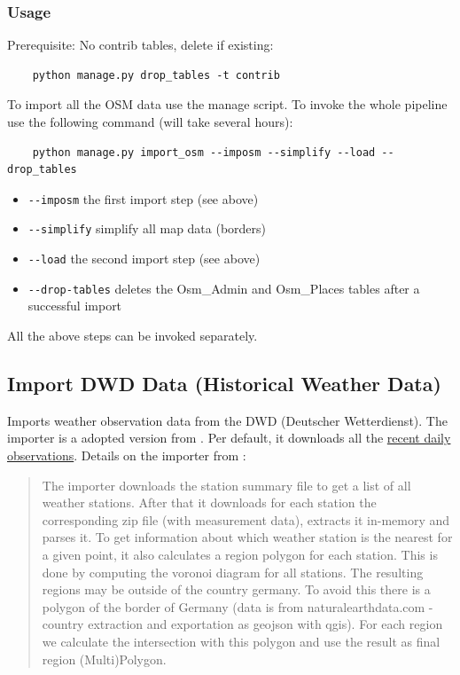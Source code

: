 \documentclass[paper=a4, fontsize=11pt]{article} %
\numberwithin{equation}{section} %
\numberwithin{figure}{section} %
\numberwithin{table}{section} %
\begin{document}
\subsubsection*{Usage}\label{usage}

Prerequisite: No contrib tables, delete if existing:
\begin{lstlisting}
	python manage.py drop_tables -t contrib
\end{lstlisting}

To import all the OSM data use the manage script. To invoke the whole pipeline use the following command (will take several hours):

\begin{lstlisting}
	python manage.py import_osm --imposm --simplify --load --drop_tables
\end{lstlisting}


\begin{itemize}
\itemsep1pt\parskip0pt
\item
  \texttt{-\/-imposm} the first import step (see above)
\item
  \texttt{-\/-simplify} simplify all map data (borders)
\item
  \texttt{-\/-load} the second import step (see above)
\item
  \texttt{-\/-drop-tables} deletes the Osm\_Admin and Osm\_Places tables
  after a successful import
\end{itemize}

All the above steps can be invoked separately.

\subsection{Import DWD Data (Historical Weather Data)}\label{import-dwd-data}

Imports weather observation data from the DWD (Deutscher Wetterdienst).
The importer is a adopted version from \textcite{website:cholin} . Per default, it downloads all the \href{ftp://ftp.dwd.de/pub/CDC/observations_germany/climate/daily/kl}{recent daily
observations}. Details on the importer from \textcite{website:cholin}:

\begin{quote}
The importer downloads the station summary file to get a list of all weather stations. After that it downloads for each station the corresponding zip file (with measurement data), extracts it in-memory and parses it. To get information about which weather station is the nearest for a given point, it also calculates a region polygon for each station. This is done by computing the voronoi diagram for all stations. The resulting regions may be outside of the country germany. To avoid this there is a polygon of the border of Germany (data is from naturalearthdata.com - country extraction and exportation as geojson with qgis). For each region we calculate the intersection with this polygon and use the result as final region (Multi)Polygon.
\end{quote}
\end{document}
